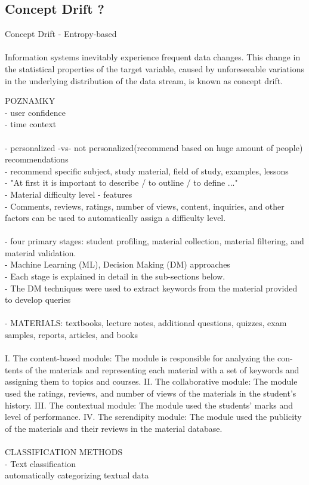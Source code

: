 \documentclass[10pt,oneside,english,a4paper]{article}
\begin{document}
\clearpage
\subsection{Concept Drift ?}
Concept Drift - Entropy-based\\\\
Information systems inevitably experience frequent data changes. 
This change in the statistical properties of the target variable, caused by
unforeseeable variations in the underlying distribution of the data
stream, is known as concept drift.\cite{Sun2024}



%
\clearpage{}
POZNAMKY\\
- user confidence\\
- time context\\\\
- personalized -vs- not personalized(recommend based on huge amount of people) recommendations\\
- recommend specific subject, study material, field of study, examples, lessons\\
- "At first it is important to describe / to outline / to define ..."\\
%
%
- Material difficulty level - features\\
- Comments, reviews, ratings, number of views, content, inquiries, and other factors can be used to automatically assign a difficulty level.\\\\
- four primary stages: student profiling, material collection, material filtering, and material validation. \\
- Machine Learning (ML), Decision Making (DM) approaches\\
- Each stage is explained in detail in the sub-sections below.\\
- The DM techniques were used to extract keywords from the material provided to develop queries\\\\
- MATERIALS: textbooks, lecture notes, additional questions, quizzes, exam samples, reports, articles, and books\\\\
%
I. The content-based module: The module is responsible for analyzing the con-
tents of the materials and representing each material with a set of keywords and
assigning them to topics and courses.
II. The collaborative module: The module used the ratings, reviews, and number of
views of the materials in the student’s history.
III. The contextual module: The module used the students’ marks and level of
performance.
IV. The serendipity module: The module used the publicity of the materials and their
reviews in the material database.
\cite{Zayet20237487}\\\\
%
CLASSIFICATION METHODS\\
- Text classification\\
automatically categorizing textual data
\end{document}
